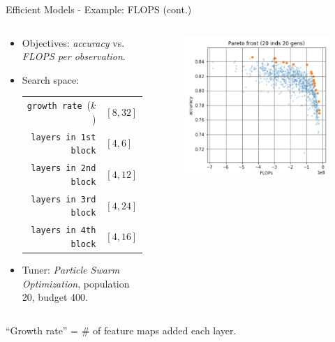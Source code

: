 \documentclass[11pt,compress,t,notes=noshow,xcolor=table]{beamer}
\begin{document}
\begin{vbframe}{Efficient Models - Example: FLOPS (cont.)}

\begin{columns}
\begin{column}{0.65\textwidth}
\begin{itemize}
  \item Objectives: \emph{accuracy} vs. \emph{FLOPS per observation}.
  \item Search space:
    \begin{tabular}{rl}
      \texttt{growth rate}~($k$)       & $[8,32]$ \\
      \texttt{layers in 1st block}     & $[4,6]$ \\
      \texttt{layers in 2nd block}     & $[4,12]$ \\
      \texttt{layers in 3rd block}     & $[4,24]$ \\
      \texttt{layers in 4th block}     & $[4,16]$ 
    \end{tabular}
  \item Tuner: \emph{Particle Swarm Optimization}, population 20, budget 400.
\end{itemize}
\end{column}
\begin{column}{0.35\textwidth}
\begin{figure}
\includegraphics[width=\textwidth]{slides/11-multicrit/figure_man/Wang_et_al_2019_Evolving_Deep_Neural_Networks_fig7_1.png}
\end{figure}
\end{column}
\end{columns}

{\footnotesize “Growth rate” = \# of feature maps added each layer.}

\end{vbframe}
\end{document}
